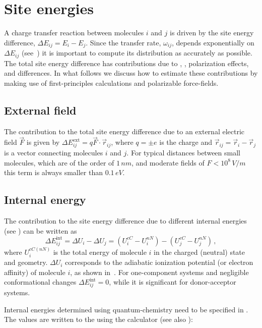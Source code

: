 \chapter{Site energies}
\label{sec:site_energies}
A charge transfer reaction between molecules $i$ and $j$ is driven by the site energy difference, $\Delta E_{ij} = E_i - E_j$. Since the  transfer rate, $\omega_{ij}$, depends exponentially on $\Delta E_{ij}$ (see~) it is important to compute its distribution as accurately as possible.  The total site energy difference has contributions due to , , polarization effects, and  differences. In what follows we discuss how to estimate these contributions by making use of first-principles calculations and polarizable force-fields.

\section{External field}
\label{sec:ext_field}
The contribution to the total site energy difference due to an external electric field $\vec{F}$ is given by $\Delta E_{ij}^\text{ext} = q {\vec{F} \cdot \vec{r}_{ij}}$, where $q=\pm e$ is the charge and $\vec{r}_{ij} = \vec{r}_i  - \vec{r}_j $ is a vector connecting molecules $i$ and $j$. For typical distances between small molecules, which are of the order  of $1\,\unit{nm}$, and moderate fields of $F<10^8\,\unit{V/m}$ this term is always smaller than $0.1\, \unit{eV}$.

\section{Internal energy}
\label{sec:internal_energy}

The contribution to the site energy difference due to different internal energies (see ) can be written as
\begin{equation}
 \Delta E_{ij}^\text{int}=
\Delta U_i - \Delta U_j = \left( U_{i}^{cC}-U_{i}^{nN}\right) - \left( U_{j}^{cC}-U_{j}^{nN}\right) \, ,
\label{equ:conformational}
\end{equation}
where $U_{i}^{cC(nN)}$ is the total energy of molecule $i$ in the charged (neutral) state and geometry.  $\Delta U_{i}$ corresponds to the adiabatic ionization potential (or electron affinity) of molecule $i$, as shown in~. For one-component systems and negligible conformational changes $ \Delta E_{ij}^\text{int}=0$, while it is significant for donor-acceptor systems. 

Internal energies determined using quantum-chemistry need to be specified in \xmlcsg. The values are written to the \sqlstate using the calculator  (see also ):
